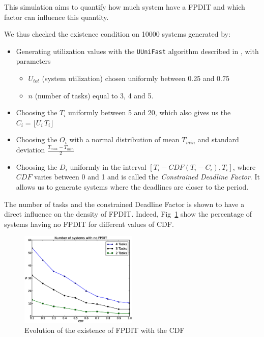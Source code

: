 \documentclass[conference]{IEEEtran}
\begin{document}
	This simulation aims to quantify how much system have a FPDIT and which factor can influence this quantity.

	We thus checked the existence condition on 10000 systems generated by:
	\begin{itemize}
		\item Generating utilization values with the \texttt{UUniFast} algorithm described in \cite{bini2005measuring}, with parameters
		\begin{itemize}
			\item $U_{tot}$ (system utilization) chosen uniformly between 0.25 and 0.75
			\item $n$ (number of tasks) equal to 3, 4 and 5.
		\end{itemize}
		\item Choosing the $T_i$ uniformly between 5 and 20, which also gives us the $C_i = \lfloor U_i \, T_i \rfloor$
		\item Choosing the $O_i$ with a normal distribution of mean $T_{min}$ and standard deviation $\frac{T_{max} - T_{min}}{2}$
		\item Choosing the $D_i$ uniformly in the interval $[T_i - CDF(T_i - C_i), T_i]$, where $CDF$ varies between 0 and 1 and is called the \emph{Constrained Deadline Factor}. It allows us to generate systems where the deadlines are closer to the period.
	\end{itemize}

	The number of tasks and the constrained Deadline Factor is shown to have a direct influence on the density of FPDIT. Indeed, Fig~\ref{fig:noFPDIT} show the percentage of systems having no FPDIT for different values of CDF.

	\begin{figure}[h]
	\begin{center}
		\includegraphics[width=0.5\textwidth]{python-simulation/plots/nofpdit_3.eps}
	\end{center}
	\caption{Evolution of the existence of FPDIT with the CDF}
	\label{fig:noFPDIT}
	\end{figure}
\end{document}
